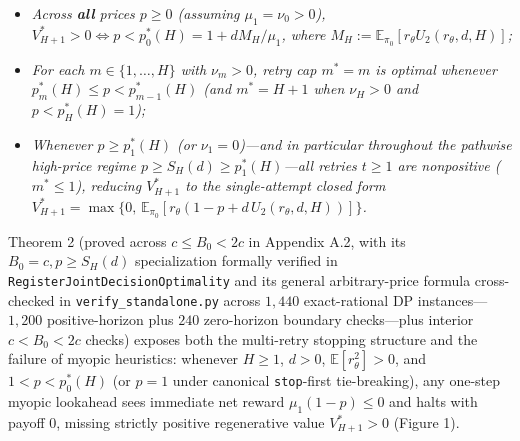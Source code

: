 \documentclass[11pt,a4paper]{article}
\providecommand{\tightlist}{\setlength{\itemsep}{2pt}\setlength{\parskip}{0pt}}
\begin{document}
\begin{enumerate}
  \begin{itemize}
  \tightlist
  \item
    \emph{Across \textbf{all} prices \(p \ge 0\) (assuming
    \(\mu_1 = \nu_0 > 0\)),
    \(V_{H+1}^* > 0 \iff p < p_0^*(H) = 1 + d M_H / \mu_1\), where
    \(M_H := \mathbb{E}_{\pi_0}[r_\theta U_2(r_\theta, d, H)]\);}
  \item
    \emph{For each \(m \in \{1, \dots, H\}\) with \(\nu_m > 0\), retry
    cap \(m^* = m\) is optimal whenever
    \(p_m^*(H) \le p < p_{m-1}^*(H)\) (and \(m^* = H + 1\) when
    \(\nu_H > 0\) and \(p < p_H^*(H) = 1\));}
  \item
    \emph{Whenever \(p \ge p_1^*(H)\) (or \(\nu_1 = 0\))---and in
    particular throughout the pathwise high-price regime
    \(p \ge S_H(d) \ge p_1^*(H)\)---all retries \(t \ge 1\) are
    nonpositive (\(m^* \le 1\)), reducing \(V_{H+1}^*\) to the
    single-attempt closed form
    \(V_{H+1}^* = \max\{0,\, \mathbb{E}_{\pi_0}[r_\theta(1 - p + d\,U_2(r_\theta, d, H))]\}\).}
  \end{itemize}
\end{enumerate}

Theorem 2 (proved across \(c \le B_0 < 2c\) in Appendix A.2, with its
\(B_0 = c, p \ge S_H(d)\) specialization formally verified in
\texttt{RegisterJointDecisionOptimality} and its general arbitrary-price
formula cross-checked in \texttt{verify\_standalone.py} across \(1,440\)
exact-rational DP instances---\(1,200\) positive-horizon plus \(240\)
zero-horizon boundary checks---plus interior \(c < B_0 < 2c\) checks)
exposes both the multi-retry stopping structure and the failure of
myopic heuristics: whenever \(H \ge 1\), \(d > 0\),
\(\mathbb{E}[r_\theta^2] > 0\), and \(1 < p < p_0^*(H)\) (or \(p = 1\)
under canonical \texttt{stop}-first tie-breaking), any one-step myopic
lookahead sees immediate net reward \(\mu_1(1 - p) \le 0\) and halts
with payoff \(0\), missing strictly positive regenerative value
\(V_{H+1}^* > 0\) (Figure 1).
\end{document}
